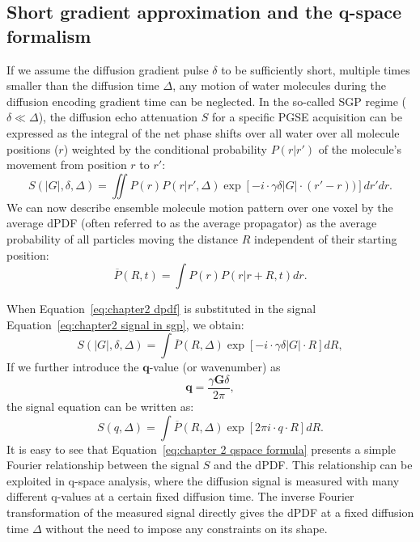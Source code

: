 \subsection{Short gradient approximation and the q-space formalism}
If we assume the diffusion gradient pulse $\delta$ to be sufficiently short, multiple times smaller than the diffusion time $\Delta$, any motion of water molecules during the diffusion encoding gradient time can be neglected. In the so-called \gls{SGP} regime ($\delta \ll \Delta$), the diffusion echo attenuation $S$ for a specific PGSE acquisition can be expressed as the integral of the net phase shifts over all water over all molecule positions ($r$) weighted by the conditional probability $P(r|r')$ of the molecule's movement from position $r$ to $r'$\citep{Callaghan:1991}:
\begin{equation}
	S(|G|,\delta,\Delta)=\iint P(r)P(r|r',\Delta)\exp[-i\cdot \gamma \delta |G|\cdot (r'-r))] dr'dr.
	\label{eq:chapter2 signal in sgp}
\end{equation}
We can now describe ensemble molecule motion pattern over one voxel by the average \gls{dPDF} (often referred to as the average propagator\citep{Kaerger:1983}) as the average probability of all particles moving the distance $R$ independent of their starting position:
\begin{equation}
	\overline{P}(R,t)=\int P(r)P(r|r+R,t)dr.
	\label{eq:chapter2 dpdf}
\end{equation}

When Equation~\ref{eq:chapter2 dpdf} is substituted in the signal Equation~\ref{eq:chapter2 signal in sgp}, we obtain:
\begin{equation}
		S(|G|,\delta,\Delta)=\int \overline{P}(R,\Delta) \exp[-i\cdot \gamma \delta |G|\cdot R] dR,
\end{equation}
If we further introduce the $\textbf{q}$-value (or wavenumber) as
 \begin{equation}
\textbf{q}=\frac{\gamma \textbf{G}\delta}{2\pi},
\label{eq: chapter 2 q value definition}
\end{equation}
the signal equation can be written as:
\begin{equation}
		S(q,\Delta)=\int \overline{P}(R,\Delta) \exp[2\pi i \cdot q\cdot R] dR.
\label{eq:chapter 2 qspace formula}
\end{equation}
It is easy to see that Equation~\ref{eq:chapter 2 qspace formula} presents a simple Fourier relationship between the signal $S$ and the \gls{dPDF}. This relationship can be exploited in q-space analysis, where the diffusion signal is measured with many different q-values at a certain fixed diffusion time. The inverse Fourier transformation of the measured signal directly gives the \gls{dPDF} at a fixed diffusion time $\Delta$ without the need to impose any constraints on its shape.

